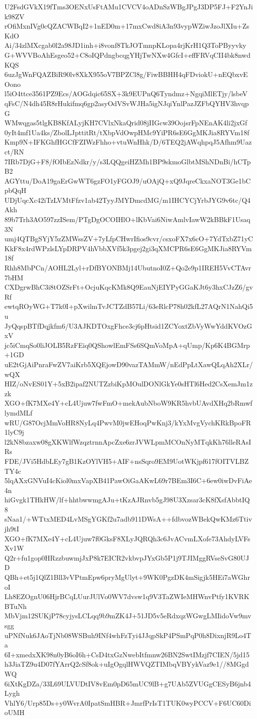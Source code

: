 U2FsdGVkX19fTms3OENxUsFtAMu1CVCV4oADnSzWBgJPgJ3DP5FJ+F2YnJik98ZV
rOfiMxnIVg0cQZACWBqI2+1nED0m+17mxCwd8iA3n93vypWZiwJzoJlXIu+ZsKdO
Ai/34zlMXcgab0l2a98JD1inh+i8vonf8TkJOTmnpKLopa4rjKrH1Q3ToPByyvky
G+WVVBoAhEsgeo52+C8oIQPdngbcqgYHjTwNXw4GfcI+effFRVqCII4bk8nwdKQS
6uzJgWnFQAZBiR90lv8XkX955oV7BPZCl8g/FiwBBHH4qFDviokU+nEQbxvEOono
l5iO4ttce3561PZ9Ecs/AOGdqic65SX+3k9EUPnQ6Tyndmz+NgqiMlETjy/lsbeV
qFsC/N4dh45R8rHukifmq6gp2asyOdVSvWJHa5igNJqiYnlPazJZFbQYHV3hvqpG
WMwqgas5tlgKB8KfALyjKH7CVlxNkaQrid08jIIGcw39OojsrFpNEnAK4li2jxGf
0yIt4mf1Ua4ks/ZbolLJpttitRt/tXbpVdOwpHMc9YiPR6sE6GgMKJia8RYVm18f
Kmp9N+IFKGhfHGCfFZIWzFhho+vtuWnHhk/D/6TEQ2jAWqhpqJ5Afhm9Uazct/RN
7IRb7DjG+F8/fOIbEzNdkr/y/s3LQQgeiHZMh1BP9skmoGlbtMShNDnBi/hCTpB2
AGYttu/DoA19gaErGwWT6gzFO1yFGOJ9/uOAjQ+xQ9JqreCkxaNOT3Ge1bCpbQqH
UDjUqcXc42iTzLVMtFfzv1ab42TyyJMYDmcdMG/m1IHCYCjYrbJYG9v6tc/Q4Akh
89b7Trh3AO597zzISem/PTgDgOCOIHlO+lKbVai6NiwAmlvIawW2kBBkF1Usaq3N
umj4QTBgSYjY5zZMWssZV+7yLfpCHwrIfios9cvr/csxoFX7x6cO+7YdTxbZ71yC
KkF8x4rdWPzlsLYpDRPV4hVbbXVf5k3pgej2gi3qXMCPR6sE6GgMKJia8RYVm18f
Rhh8MbPCn/AOHL2Lyl+rDfBYONBMj14UbutnoI0Z+Qo2e9p1IREH5VvCTAvr7bHM
CXDgrwBhC3i8tOZSrFt+OcjuKqcKMk8Q9EauNjEIYPyGGaKJt6y3hxCJzZ6/gvRf
ewtqROyWG+T7k0I+pXwilmTvJCTZdB57Li/63eRlcP78h02kfL27AQrN1NahQi5u
JyQqspBTfDqjkfm6/U3AJKDTOxgFhce3cj6pHtsid1ZCYoxtZbVyWwYddKVOzGxV
jc5iCmqSo0liJOLB5RzFEiq0QShowlEmFSs6SQmVoMpA+qUmp/Kp6K4BGMrp+1GD
uE2tGjAiPnraFwZV7aiKrb5XQEjowD90vazTAMmW/nEdPpLtXawQLqAh2XLr/wQX
HIZ/oNvES01Y+5xB2ipaf2NUTZzbiKpMOulDONlGkYe0sHTl6Hed2CsXemJm1zzk
XGO+fK7MXe4Y+cL4Ujuw7fwFmO+mekAubNboW9KR5hvbUAvdXHq2bRmwflymdMLf
wRU/G87OcjMmVoHR8NyLq4PwvM0jwEHoqPwKnj3/kYxMvgVychKRkBpoFR1lyC9j
l2kN8bzaxw08gXKWlfWzqztrnnApcZxe6zrJVWLpmMCOnNyMTqkKh76lleRAsIRs
FDE/JVi5HdbLEy7gB1KzOYlVH5+AIF+nsSqro9EM9UotWKjpf617fOITVLBZTY4c
5lqAXxGNVuI4cKiol0mxVapXB41PawOiGaAKwL69r7BEm3I6C+6ew0iwDvFiAe4n
hiGvgk1THkHW/lf+hhtbwwmgAJu+tKzAJRnvb5gJ98U3Xzsar3cK8fXsfAbbtIQ8
sNaa1/+WTtxMED4LvMSgYGKf2u7adb911DWsA++fdbvozWBekQwKMz6Ttivjh9tI
XGO+fK7MXe4Y+cL4Ujuw7f0GksF8XLyJQRQh3c6JvACvmLXofe73AhdyLVFsXv1W
Q2r+fu1gop0HRzzbuwmjJxP8k7EICR2vkbvpJYxGb5P1j9TJIMggRVseSvG80UJD
QBh+et5j1QlZ1Bll3vVPtmEpw6pryMgUlyt+9WK0PgzDK4mSigjk5HEi7aWGhroI
Lh8EZOgnU06HjrBCqLUurJUlVo0WV7dvsw1q9V3TaZWIeMHWnvPtfy1KVRKBTuNh
MbVjm12SUKjP78cyjysLCLqq9b9mZK4J+51JD5v5eRdxqzWGwgLMIidoVw9mvsgg
uPNfNuk6JAoTjNb08WSBuh9INf4whFzTyi4JJqpSkP4PSmPqP0h8DixnjR9Lo4Ta
6I+xmedxXK98n0yB6oI6h+CsD4txGzNwebItfmnw26BN2SwtIMzjf7CIEN/5jd15
h3JiaTZ9u4D07fYArrQ2cSf8ok+uIgOgqlHWVQZTIMbqVBYykVaz9e1//8MGgdWQ
6iXtKgDZa/33L69ULVUDtIV8vEm0pD65mUC9lB+g7UAb5ZVUGgCESyB6jnb4Lygh
VhlY6/Urp85Ds+y0WvrA0IpatSmHBR+JmrfPrIsT1TUK0wyPCCV+F6UC60DioUMH
